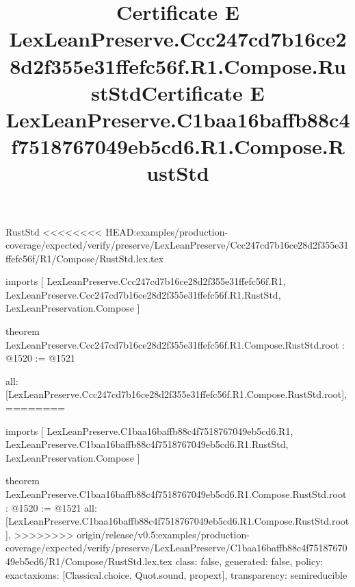\begin{lexlean}{RustStd}
<<<<<<<< HEAD:examples/production-coverage/expected/verify/preserve/LexLeanPreserve/Ccc247cd7b16ce28d2f355e31ffefc56f/R1/Compose/RustStd.lex.tex
\title{Certificate E LexLeanPreserve.Ccc247cd7b16ce28d2f355e31ffefc56f.R1.Compose.RustStd}
\begin{coremodule}
imports [
  LexLeanPreserve.Ccc247cd7b16ce28d2f355e31ffefc56f.R1,
  LexLeanPreserve.Ccc247cd7b16ce28d2f355e31ffefc56f.R1.RustStd,
  LexLeanPreservation.Compose
]

theorem LexLeanPreserve.Ccc247cd7b16ce28d2f355e31ffefc56f.R1.Compose.RustStd.root : @1520 := @1521 {
  all: [LexLeanPreserve.Ccc247cd7b16ce28d2f355e31ffefc56f.R1.Compose.RustStd.root],
========
\title{Certificate E LexLeanPreserve.C1baa16baffb88c4f7518767049eb5cd6.R1.Compose.RustStd}
\begin{coremodule}
imports [
  LexLeanPreserve.C1baa16baffb88c4f7518767049eb5cd6.R1,
  LexLeanPreserve.C1baa16baffb88c4f7518767049eb5cd6.R1.RustStd,
  LexLeanPreservation.Compose
]

theorem LexLeanPreserve.C1baa16baffb88c4f7518767049eb5cd6.R1.Compose.RustStd.root : @1520 := @1521 {
  all: [LexLeanPreserve.C1baa16baffb88c4f7518767049eb5cd6.R1.Compose.RustStd.root],
>>>>>>>> origin/release/v0.5:examples/production-coverage/expected/verify/preserve/LexLeanPreserve/C1baa16baffb88c4f7518767049eb5cd6/R1/Compose/RustStd.lex.tex
  class: false,
  generated: false,
  policy: exact{axioms: [Classical.choice, Quot.sound, propext]},
  transparency: semireducible
}


\end{coremodule}}
\end{coremodule}
\end{lexlean}
